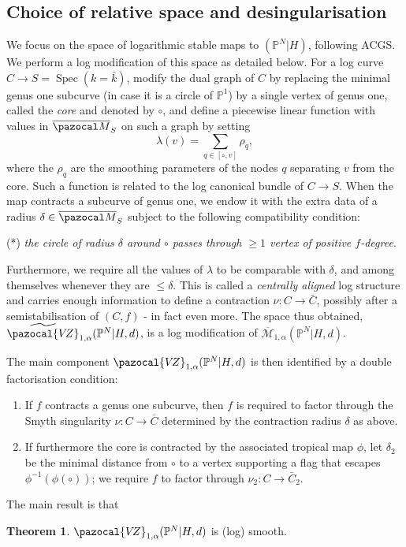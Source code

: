 \documentclass[11pt]{amsart}
\newcommand{\M}[4]{\overline{\mathcal{M}}_{#1,#2}(#3,#4)}
\newcommand{\PP}{\mathbb P}
\newcommand{\VZ}{\pazocal{V\!Z}}
\renewcommand{\to}{\rightarrow}
\newcommand{\Spec}{\operatorname{Spec}}
\theoremstyle{definition}
\newtheorem{thm}{Theorem}[section]
\theoremstyle{definition}
\begin{document}
\subsection{Choice of relative space and desingularisation} We focus on the space of logarithmic stable maps to $(\PP^N|H)$, following ACGS. We perform a log modification of this space as detailed below. For a log curve $C\to S=\Spec(k=\bar k)$, modify the dual graph of $C$ by replacing the minimal genus one subcurve (in case it is a circle of $\PP^1$) by a single vertex of genus one, called the \emph{core} and denoted by $\circ$, and define a piecewise linear function with values in $\overline{\pazocal M}_S$ on such a graph by setting \[\lambda(v)=\sum_{q\in[\circ,v]}\rho_q,\]
where the $\rho_q$ are the smoothing parameters of the nodes $q$ separating $v$ from the core. Such a function is related to the log canonical bundle of $C\to S$. When the map contracts a subcurve of genus one, we endow it with the extra data of a radius $\delta\in\overline{\pazocal M}_S$ subject to the following compatibility condition:

(*) \emph{the circle of radius $\delta$ around $\circ$ passes through $\geq1$ vertex of positive $f$-degree}.

\noindent Furthermore, we require all the values of $\lambda$ to be comparable with $\delta$, and among themselves whenever they are $\leq \delta$. This is called a \emph{centrally aligned} log structure and carries enough information to define a contraction $\nu\colon C\to \bar{C}$, possibly after a semistabilisation of $(C,f)$ - in fact even more. The space thus obtained, $\widetilde \VZ_{1,\alpha}(\PP^N|H,d)$, is a log modification of $\M{1}{\alpha}{\PP^N|H}{d}$.

The main component $\VZ_{1,\alpha}(\PP^N|H,d)$ is then identified by a double factorisation condition:
\begin{enumerate}
 \item If $f$ contracts a genus one subcurve, then $f$ is required to factor through the Smyth singularity $\nu\colon C\to \bar C$ determined by the contraction radius $\delta$ as above.
 \item If furthermore the core is contracted by the associated tropical map $\phi$, let $\delta_2$ be the minimal distance from $\circ$ to a vertex supporting a flag that escapes $\phi^{-1}(\phi(\circ))$; we require $f$ to factor through $\nu_2\colon C\to\bar C_2$.
\end{enumerate}
The main result is that
\begin{thm}
 $\VZ_{1,\alpha}(\PP^N|H,d)$ is (log) smooth.
\end{thm}
\end{document}
